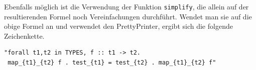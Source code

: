 Ebenfalls möglich ist die Verwendung der Funktion \texttt{simplify}, die allein auf der resultierenden Formel noch Vereinfachungen
durchführt. Wendet man sie auf die obige Formel an und verwendet den PrettyPrinter, ergibt sich die folgende
Zeichenkette.

\begin{verbatim}
"forall t1,t2 in TYPES, f :: t1 -> t2.
 map_{t1}_{t2} f . test_{t1} = test_{t2} . map_{t1}_{t2} f"
\end{verbatim}